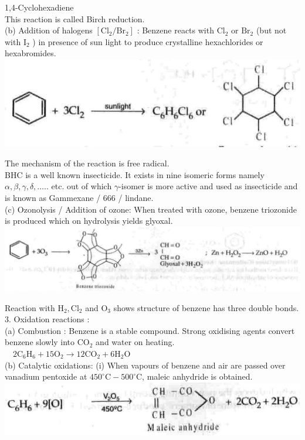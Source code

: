 \documentclass[10pt]{article}
\begin{document}
1,4-Cyclohexadiene\\
This reaction is called Birch reduction.\\
(b) Addition of halogens $\left[\mathrm{Cl}_{2} / \mathrm{Br}_{2}\right]$ : Benzene reacts with $\mathrm{Cl}_{2}$ or $\mathrm{Br}_{2}$ (but not with $\mathrm{I}_{2}$ ) in presence of sun light to produce crystalline hexachlorides or hexabromides.\\
\includegraphics[max width=\textwidth, center]{2025_01_28_8470952b98110cec3aabg-210(5)}

The mechanism of the reaction is free radical.\\
BHC is a well known insecticide. It exists in nine isomeric forms namely $\alpha, \beta, \gamma, \delta, \ldots .$. etc. out of which $\gamma$-isomer is more active and used as insecticide and is known as Gammexane / 666 / lindane.\\
(c) Ozonolysis / Addition of ozone: When treated with ozone, benzene triozonide is produced which on hydrolysis yields glyoxal.\\
\includegraphics[max width=\textwidth, center]{2025_01_28_8470952b98110cec3aabg-210(6)}

Reaction with $\mathrm{H}_{2}, \mathrm{Cl}_{2}$ and $\mathrm{O}_{3}$ shows structure of benzene has three double bonds.\\
3. Oxidation reactions :\\
(a) Combustion : Benzene is a stable compound. Strong oxidising agents convert benzene slowly into $\mathrm{CO}_{2}$ and water on heating. $\quad 2 \mathrm{C}_{6} \mathrm{H}_{6}+15 \mathrm{O}_{2} \longrightarrow 12 \mathrm{CO}_{2}+6 \mathrm{H}_{2} \mathrm{O}$\\
(b) Catalytic oxidations: (i) When vapours of benzene and air are passed over vanadium pentoxide at $450^{\circ} \mathrm{C}-500^{\circ} \mathrm{C}$, maleic anhydride is obtained.\\
\includegraphics[max width=\textwidth, center]{2025_01_28_8470952b98110cec3aabg-211(3)}
\end{document}
